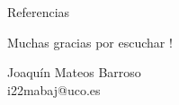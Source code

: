 \documentclass[aspectratio=169]{beamer}
\begin{document}
\begin{frame}{Referencias}
	\nocite{*}
	
	
\end{frame}

\begin{frame}
\begin{center}
{ Muchas gracias por escuchar !}
\vspace{1cm}

Joaquín Mateos Barroso \\  [1em]
i22mabaj@uco.es 
\end{center}
\end{frame}
\end{document}
